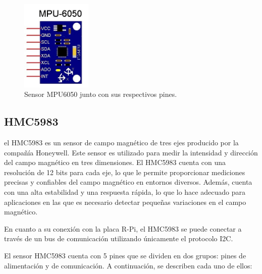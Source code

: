 \begin{figure}[h!]
\centering
\includegraphics[width=0.3\textwidth]{images/mpu6050.jpg}
\caption[Sensor MPU6050]{Sensor MPU6050 junto con sus respectivos pines.}%
\label{fig:mpu6050}
\end{figure}



\subsection{HMC5983}
el HMC5983 es un sensor de campo magnético de tres ejes producido por la compañía Honeywell. Este sensor es utilizado para medir la intensidad y dirección del campo magnético en tres dimensiones. El HMC5983 cuenta con una resolución de 12 bits para cada eje, lo que le permite proporcionar mediciones precisas y confiables del campo magnético en entornos diversos. Además, cuenta con una alta estabilidad y una respuesta rápida, lo que lo hace adecuado para aplicaciones en las que es necesario detectar pequeñas variaciones en el campo magnético.

En cuanto a su conexión con la placa R-Pi, el HMC5983 se puede conectar a través de un bus de comunicación utilizando únicamente el protocolo I2C.

El sensor HMC5983 cuenta con 5 pines que se dividen en dos grupos: pines de alimentación y de comunicación. A continuación, se describen cada uno de ellos:


